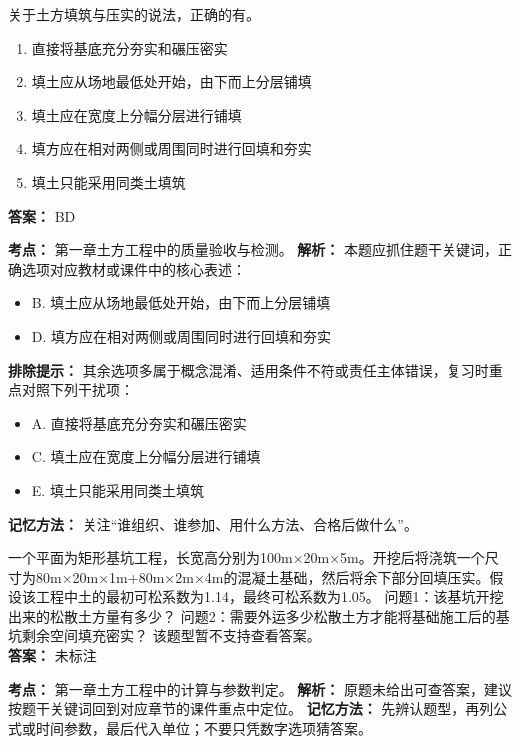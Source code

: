 \documentclass[UTF8,fontset=fandol,11pt]{ctexart}
\begin{document}
\begin{quizbox}[title={第 32 题}]
关于土方填筑与压实的说法，正确的有。\\
\begin{enumerate}[label=\Alph*.]
\item 直接将基底充分夯实和碾压密实
\item 填土应从场地最低处开始，由下而上分层铺填
\item 填土应在宽度上分幅分层进行铺填
\item 填方应在相对两侧或周围同时进行回填和夯实
\item 填土只能采用同类土填筑
\end{enumerate}
\textbf{答案：} BD
\vspace{0.25em}
\begin{answerbox}[title={考点解析}]
\textbf{考点：} 第一章土方工程中的质量验收与检测。
\textbf{解析：} 本题应抓住题干关键词，正确选项对应教材或课件中的核心表述：
\begin{itemize}
\item B. 填土应从场地最低处开始，由下而上分层铺填
\item D. 填方应在相对两侧或周围同时进行回填和夯实
\end{itemize}
\textbf{排除提示：} 其余选项多属于概念混淆、适用条件不符或责任主体错误，复习时重点对照下列干扰项：
\begin{itemize}
\item A. 直接将基底充分夯实和碾压密实
\item C. 填土应在宽度上分幅分层进行铺填
\item E. 填土只能采用同类土填筑
\end{itemize}
\textbf{记忆方法：} 关注“谁组织、谁参加、用什么方法、合格后做什么”。
\end{answerbox}
\end{quizbox}

\begin{quizbox}[title={第 33 题}]
一个平面为矩形基坑工程，长宽高分别为100m×20m×5m。开挖后将浇筑一个尺寸为80m×20m×1m+80m×2m×4m的混凝土基础，然后将余下部分回填压实。假设该工程中土的最初可松系数为1.14，最终可松系数为1.05。 问题1：该基坑开挖出来的松散土方量有多少？ 问题2：需要外运多少松散土方才能将基础施工后的基坑剩余空间填充密实？ 该题型暂不支持查看答案。\\
\textbf{答案：} 未标注
\vspace{0.25em}
\begin{answerbox}[title={考点解析}]
\textbf{考点：} 第一章土方工程中的计算与参数判定。
\textbf{解析：} 原题未给出可查答案，建议按题干关键词回到对应章节的课件重点中定位。
\textbf{记忆方法：} 先辨认题型，再列公式或时间参数，最后代入单位；不要只凭数字选项猜答案。
\end{answerbox}
\end{quizbox}
\end{document}

